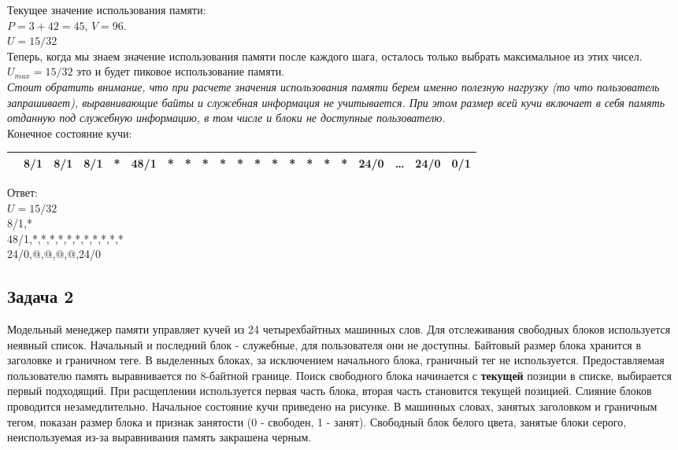\documentclass[12pt, letterpaper]{article}
\begin{document}
Текущее значение использования памяти:\\
$P=3 + 42 = 45$, $V=96$.\\ 
$U=15/32$\\

Теперь, когда мы знаем значение использования памяти после каждого шага, осталось только выбрать максимальное из этих чисел. $U_{max}=15/32$ это и будет пиковое использование памяти.\\
\textit{Стоит обратить внимание, что при расчете значения использования памяти берем именно полезную нагрузку (то что пользователь запрашивает), выравнивающие байты и служебная информация не учитывается. При этом размер всей кучи включает в себя память отданную под служебную информацию, в том числе и блоки не доступные пользователю.}\\
Конечное состояние кучи:
\begin{center}
    \begin{tabular}{|c|c|c|c|c|c|c|c|c|c|c|c|c|c|c|c|c|c|c|c|c|}
        \hline
         \cellcolor{black} & \cellcolor[gray]{0.9} 8/1 & \cellcolor[gray]{0.9} 8/1 &\cellcolor{red!=40}8/1 &\cellcolor{red!=40}*&\cellcolor{green!=40}48/1 &\cellcolor{green!=40}*&\cellcolor{green!=40}*&\cellcolor{green!=40}*&\cellcolor{green!=40}*&\cellcolor{green!=40}*&\cellcolor{green!=40}*&\cellcolor{green!=40}*&\cellcolor{green!=40}*&\cellcolor{green!=40}*&\cellcolor{green!=40}*&\cellcolor{green!=40}*& 24/0 &\dots & 24/0 & 0/1 \\
        \hline
    \end{tabular}
\end{center}
Ответ:\\
$U=15/32$\\
8/1,*\\
48/1,*,*,*,*,*,*,*,*,*,*,*\\
24/0,@,@,@,@,24/0
\newpage
\subsection{Задача 2}

Модельный менеджер памяти управляет кучей из 24 четырехбайтных машинных слов. Для отслеживания свободных блоков используется неявный список. Начальный и последний блок - служебные, для пользователя они не доступны. Байтовый размер блока хранится в заголовке и граничном теге. В выделенных блоках, за исключением начального блока, граничный тег не используется. Предоставляемая пользователю память выравнивается по 8-байтной границе. Поиск свободного блока начинается с \textbf{текущей} позиции в списке, выбирается первый подходящий. При расщеплении используется первая часть блока, вторая часть становится текущей позицией. Слияние блоков проводится незамедлительно. Начальное состояние кучи приведено на рисунке. В машинных словах, занятых заголовком и граничным тегом, показан размер блока и признак занятости (0 - свободен, 1 - занят). Свободный блок белого цвета, занятые блоки серого, неиспользуемая из-за выравнивания память закрашена черным.
\end{document}
